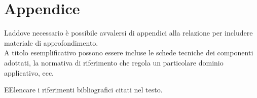 \documentclass[12pt]{article}
\begin{document}

\appendix
{}
\section*{Appendice}
Laddove necessario è possibile avvalersi di appendici alla relazione per includere materiale di approfondimento.\\

A titolo esemplificativo possono essere incluse le schede tecniche dei componenti adottati, la normativa di riferimento che regola un particolare dominio applicativo, ecc.


\newpage


\begin{thebibliography}
EElencare i riferimenti bibliografici citati nel testo. 
\end{thebibliography}

\end{document}
